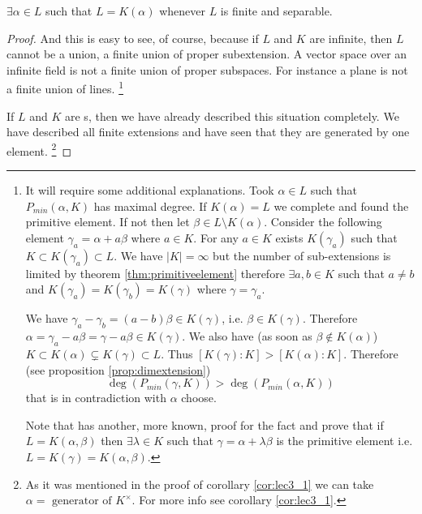 \begin{corollary}
  $\exists \alpha \in L$ such that $L = K\left( \alpha \right)$
  whenever $L$ is finite and separable.
  \begin{proof}
    And this is easy to see, of course, because
    if $L$ and $K$ are infinite, then 
    $L$ cannot be a union, a finite union of proper subextension. 
    A vector space over an infinite field is not a finite union of
    proper subspaces.   For instance a plane is not a finite union of
    lines.
    \footnote{
      It will require some additional explanations. Took
      $\alpha \in L$ such that $P_{min}\left(\alpha, K\right)$ has
      maximal degree. If $K\left(\alpha\right) = L$ we complete and
      found the primitive element. If not then let
      $\beta \in L \setminus K\left(\alpha\right)$. Consider the
      following element $\gamma_a = \alpha + a \beta$ where $a \in
      K$. For any $a \in K$ exists $K\left(\gamma_a\right)$ such that
      $K \subset K\left(\gamma_a\right) \subset L$. We have
      $\left|K\right| = \infty$ but the 
      number of sub-extensions is limited by theorem
      \ref{thm:primitiveelement} therefore $\exists a, b \in K$ such that
      $a \ne b$ and $K\left(\gamma_a\right) =
      K\left(\gamma_b\right) = K\left(\gamma\right)$ where $\gamma =
      \gamma_a$. 

      We have $\gamma_a - \gamma_b = (a-b) \beta \in K\left(\gamma\right)$, i.e.
      $\beta \in K\left(\gamma\right)$. Therefore
      $\alpha = \gamma_a -a \beta = \gamma -a \beta \in
      K\left(\gamma\right)$. We also 
      have (as soon as $\beta \notin 
      K\left(\alpha\right)$) $K \subset K\left(\alpha\right)
      \subsetneq K\left(\gamma\right) 
      \subset L$. Thus $\left[K\left(\gamma\right):K\right] >
      \left[K\left(\alpha\right):K\right]$. Therefore
      (see proposition \ref{prop:dimextension})
      \[
      \deg\left(P_{min}\left(\gamma, K\right)\right) >
      \deg\left(P_{min}\left(\alpha, K\right)\right)
      \]
      that is in contradiction with $\alpha$ choose.

      Note that \cite{bib:KenBrownPrimitiveElementTheorem} has another,
      more known, proof for the fact and prove that if
      $L = K\left(\alpha, \beta\right)$ then $\exists \lambda \in K$
      such that $\gamma = \alpha + \lambda \beta$ is the primitive
      element i.e. $L = K\left(\gamma\right) = K\left(\alpha,
      \beta\right)$. 
    }
    
    If $L$ and $K$ are s, then we have
    already described this situation completely. We have described all
    finite extensions and have seen that they are generated by one element.
    \footnote{
      As it was mentioned in the proof of corollary \ref{cor:lec3_1}
      we can take $\alpha = \mbox{ generator of } K^\times$. For more info
      see corollary \ref{cor:lec3_1}.
    }
  \end{proof}
  \label{col:primitiveelement}
\end{corollary}

